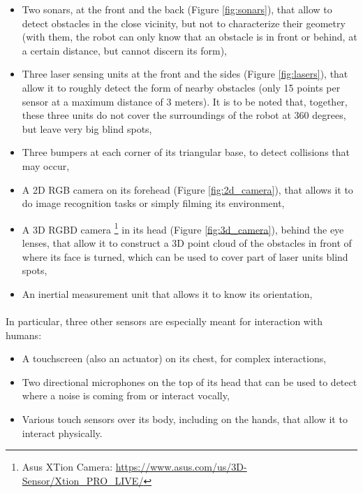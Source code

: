 \begin{itemize}
  \item Two sonars, at the front and the back (Figure \ref{fig:sonars}), that allow to detect obstacles in the close vicinity, but not to characterize their geometry (with them, the robot can only know that an obstacle is in front or behind, at a certain distance, but cannot discern its form),
  \item Three laser sensing units at the front and the sides (Figure \ref{fig:lasers}), that allow it to roughly detect the form of nearby obstacles (only 15 points per sensor at a maximum distance of 3 meters). It is to be noted that, together, these three units do not cover the surroundings of the robot at 360 degrees, but leave very big blind spots,
  \item Three bumpers at each corner of its triangular base, to detect collisions that may occur,
  \item A 2D RGB camera on its forehead (Figure \ref{fig:2d_camera}), that allows it to do image recognition tasks or simply filming its environment,
  \item A 3D RGBD camera \footnote{Asus XTion Camera: \url{https://www.asus.com/us/3D-Sensor/Xtion_PRO_LIVE/}} in its head (Figure \ref{fig:3d_camera}), behind the eye lenses, that allow it to construct a 3D point cloud of the obstacles in front of where its face is turned, which can be used to cover part of laser units blind spots,
  \item An inertial measurement unit that allows it to know its orientation,
\end{itemize}

\paragraph{} In particular, three other sensors are especially meant for interaction with humans:

\begin{itemize}
  \item A touchscreen (also an actuator) on its chest, for complex interactions,
  \item Two directional microphones on the top of its head that can be used to detect where a noise is coming from or interact vocally,
  \item Various touch sensors over its body, including on the hands, that allow it to interact physically.
\end{itemize}

